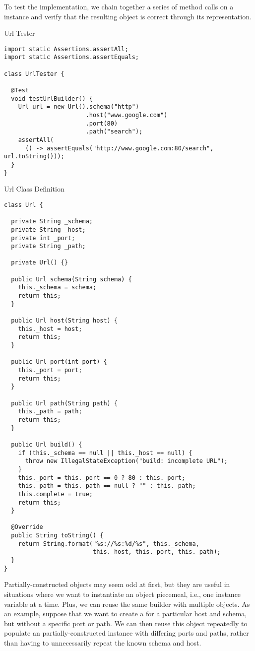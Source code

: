 To test the implementation, we chain together a series of method calls on a  instance and verify that the resulting  object is correct through its  representation.

\begin{cl}{Url Tester}
\begin{lstlisting}[language=MyJava]
import static Assertions.assertAll;
import static Assertions.assertEquals;

class UrlTester {

  @Test
  void testUrlBuilder() {
    Url url = new Url().schema("http")
                       .host("www.google.com")
                       .port(80)
                       .path("search");
    assertAll(
      () -> assertEquals("http://www.google.com:80/search", url.toString()));
  }
}
\end{lstlisting}
\end{cl}

\begin{cl}{Url Class Definition}
\begin{lstlisting}[language=MyJava]
class Url {

  private String _schema;
  private String _host;
  private int _port;
  private String _path;
  
  private Url() {}

  public Url schema(String schema) {
    this._schema = schema;
    return this;
  }

  public Url host(String host) {
    this._host = host;
    return this;
  }

  public Url port(int port) {
    this._port = port;
    return this;
  }

  public Url path(String path) {
    this._path = path;
    return this;
  }

  public Url build() {
    if (this._schema == null || this._host == null) {
      throw new IllegalStateException("build: incomplete URL");
    }
    this._port = this._port == 0 ? 80 : this._port;
    this._path = this._path == null ? "" : this._path;
    this.complete = true;
    return this;
  }

  @Override
  public String toString() {
    return String.format("%s://%s:%d/%s", this._schema,
                         this._host, this._port, this._path);
  }
}
\end{lstlisting}
\end{cl}

Partially-constructed objects may seem odd at first, but they are useful in situations where we want to instantiate an object piecemeal, i.e., one instance variable at a time. Plus, we can reuse the same builder with multiple objects. As an example, suppose that we want to create a  for a particular host and schema, but without a specific port or path. We can then reuse this object repeatedly to populate an partially-constructed instance with differing ports and paths, rather than having to unnecessarily repeat the known schema and host.

